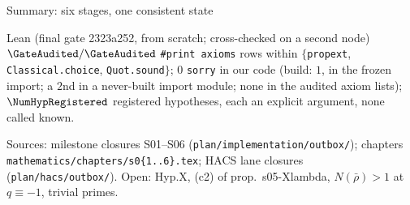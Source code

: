 \begin{frame}[shrink=5]{Summary: six stages, one consistent state}
  \vspace{-3mm}
  \begin{block}{Lean (final gate 2323a252, from scratch; cross-checked on a second node)}
    $\GateAudited/\GateAudited$ \texttt{\#print axioms} rows within $\{$\texttt{propext}, \texttt{Classical.choice}, \texttt{Quot.sound}$\}$;
    $0$ \texttt{sorry} in our code (build: $1$, in the frozen import; a $2$nd in a never-built import module; none in the audited axiom lists); $\NumHypRegistered$ registered hypotheses, each an explicit argument, none called known.
  \end{block}
  \vfill
  {\tiny Sources: milestone closures S01--S06 (\texttt{plan/implementation/outbox/}); chapters \texttt{mathematics/chapters/s0\{1..6\}.tex}; HACS lane closures (\texttt{plan/hacs/outbox/}).
  Open: Hyp.X, (c2) of prop.\ s05-Xlambda, $N(\bar\rho)>1$ at $q\equiv-1$, trivial primes.}
\end{frame}
